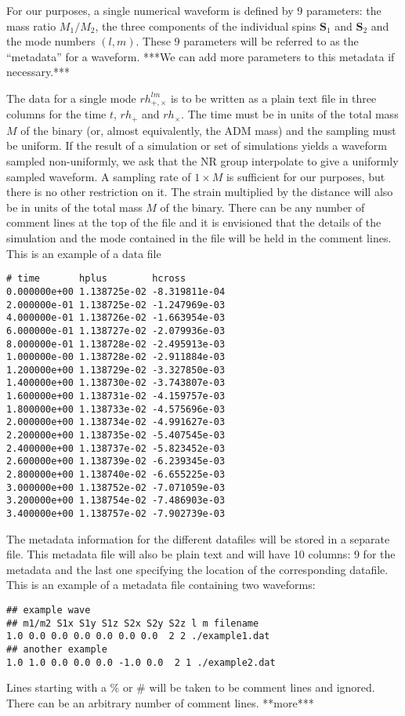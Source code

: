 \documentclass{article}
\numberwithin{equation}{section}
\begin{document}
For our purposes, a single numerical waveform is defined by 9
parameters: the mass ratio $M_1/M_2$, the three components of the
individual spins $\mathbf{S}_1$ and $\mathbf{S}_2$ and the mode
numbers $(l,m)$.  These 9 parameters will be referred to as the
``metadata'' for a waveform.  ***We can add more parameters to this
metadata if necessary.***

The data for a single mode $rh_{+,\times}^{lm}$ is to be written as a
plain text file in three columns for the time $t$, $rh_+$ and
$rh_\times$.  The time must be in units of the total mass $M$ of the
binary (or, almost equivalently, the ADM mass) and the sampling must be
uniform.  If the result of a simulation or set of simulations yields a
waveform sampled non-uniformly, we ask that the NR group interpolate to
give a uniformly sampled waveform.  A sampling rate of $1\times M$ is
sufficient for our purposes, but there is no other restriction on it.
The strain multiplied by the distance will also be in units of the total
mass $M$ of the binary.  There can be any number of comment lines at the
top of the file and it is envisioned that the details of the simulation
and the mode contained in the file will be held in the comment lines.
This is an example of a data file 

\begin{verbatim}
# time       hplus        hcross
0.000000e+00 1.138725e-02 -8.319811e-04
2.000000e-01 1.138725e-02 -1.247969e-03
4.000000e-01 1.138726e-02 -1.663954e-03
6.000000e-01 1.138727e-02 -2.079936e-03
8.000000e-01 1.138728e-02 -2.495913e-03
1.000000e-00 1.138728e-02 -2.911884e-03
1.200000e+00 1.138729e-02 -3.327850e-03
1.400000e+00 1.138730e-02 -3.743807e-03
1.600000e+00 1.138731e-02 -4.159757e-03
1.800000e+00 1.138733e-02 -4.575696e-03
2.000000e+00 1.138734e-02 -4.991627e-03
2.200000e+00 1.138735e-02 -5.407545e-03
2.400000e+00 1.138737e-02 -5.823452e-03
2.600000e+00 1.138739e-02 -6.239345e-03
2.800000e+00 1.138740e-02 -6.655225e-03
3.000000e+00 1.138752e-02 -7.071059e-03
3.200000e+00 1.138754e-02 -7.486903e-03
3.400000e+00 1.138757e-02 -7.902739e-03
\end{verbatim}

The metadata information for the different datafiles will be stored in
a separate file.  This metadata file will also be plain text and
will have 10 columns: 9 for the metadata and the last one specifying
the location of the corresponding datafile.  This is an example of a
metadata file containing two waveforms:
\begin{verbatim}
## example wave
## m1/m2 S1x S1y S1z S2x S2y S2z l m filename
1.0 0.0 0.0 0.0 0.0 0.0 0.0  2 2 ./example1.dat
## another example
1.0 1.0 0.0 0.0 0.0 -1.0 0.0  2 1 ./example2.dat
\end{verbatim}
Lines starting with a $\%$ or $\#$ will be taken to be comment lines and
ignored. There can be an arbitrary number of comment lines.  **more***
\end{document}
